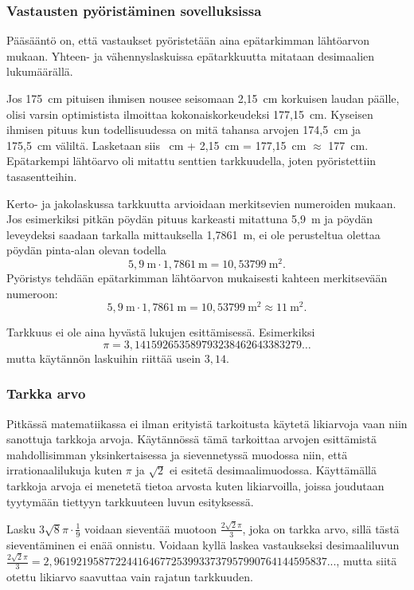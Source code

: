 \subsubsection*{Vastausten pyöristäminen sovelluksissa}

Pääsääntö on, että vastaukset pyöristetään aina epätarkimman lähtöarvon mukaan. Yhteen- ja vähennyslaskuissa epätarkkuutta mitataan desimaalien lukumäärällä.

\begin{esimerkki} Jos 175~cm pituisen ihmisen nousee seisomaan 2,15~cm korkuisen laudan päälle, olisi varsin optimistista ilmoittaa kokonaiskorkeudeksi 177,15~cm. Kyseisen ihmisen pituus kun todellisuudessa on mitä tahansa arvojen
174,5~cm ja 175,5~cm väliltä. Lasketaan siis ~cm + 2,15~cm = 177,15~cm $\approx$ 177~cm. 
Epätarkempi lähtöarvo oli mitattu senttien tarkkuudella, joten pyöristettiin tasasentteihin.
\end{esimerkki}

Kerto- ja jakolaskussa tarkkuutta arvioidaan merkitsevien numeroiden mukaan. Jos esimerkiksi pitkän pöydän pituus karkeasti mitattuna 5,9~m ja pöydän leveydeksi saadaan tarkalla mittauksella 1,7861~m, ei ole perusteltua olettaa pöydän pinta-alan olevan todella
\[ 5,9~\textrm{m} \cdot 1,7861~\textrm{m} = 10,53799~\textrm{m}^2. \] 
Pyöristys tehdään epätarkimman lähtöarvon mukaisesti kahteen merkitsevään numeroon:
\[ 5,9~\textrm{m} \cdot 1,7861~\textrm{m} = 10,53799~\textrm{m}^2 \approx 11~\textrm{m}^2.\] 

Tarkkuus ei ole aina hyvästä lukujen esittämisessä. Esimerkiksi
\[ \pi = 3,141592653589793238462643383279 \ldots \]
mutta käytännön laskuihin riittää usein $3,14$.


\subsubsection*{Tarkka arvo}

Pitkässä matematiikassa ei ilman erityistä tarkoitusta käytetä likiarvoja vaan niin sanottuja tarkkoja arvoja. Käytännössä tämä tarkoittaa arvojen esittämistä mahdollisimman yksinkertaisessa ja sievennetyssä muodossa niin, että irrationaalilukuja kuten $\pi$ ja $\sqrt{2}$ ei esitetä desimaalimuodossa. Käyttämällä tarkkoja arvoja ei menetetä tietoa arvosta kuten likiarvoilla, joissa joudutaan tyytymään tiettyyn tarkkuuteen luvun esityksessä.

\begin{esimerkki}
Lasku $3\sqrt{8}\pi \cdot \frac{1}{9}$ voidaan sieventää muotoon $\frac{2\sqrt{2}\pi}{3}$, joka on tarkka arvo, sillä tästä sieventäminen ei enää onnistu. Voidaan kyllä laskea vastaukseksi desimaaliluvun $\frac{2\sqrt{2}\pi}{3}=2,9619219587722441646772539933737957990764144595837...$, mutta siitä otettu likiarvo saavuttaa vain rajatun tarkkuuden. 
\end{esimerkki}

